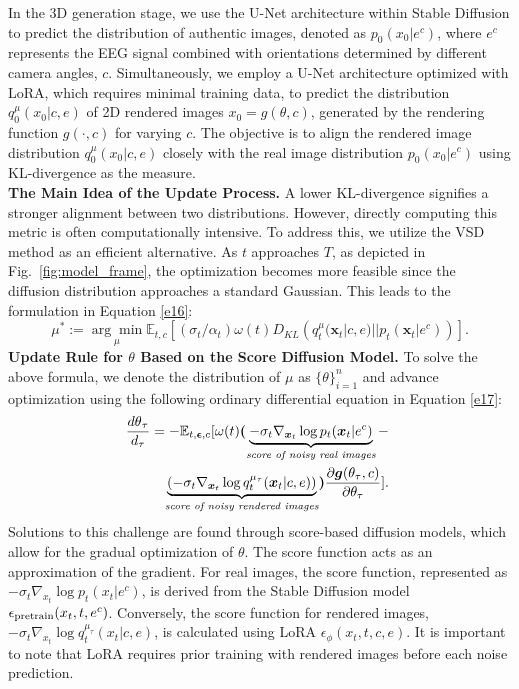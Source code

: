 \documentclass[conference]{IEEEtran}
\begin{document}
In the 3D generation stage, we use the U-Net architecture within Stable Diffusion to predict the distribution of authentic images, denoted as $ p_0(x_0|e^c) $, where $ e^c $ represents the EEG signal combined with orientations determined by different camera angles, $ c $. Simultaneously, we employ a U-Net architecture optimized with LoRA, which requires minimal training data, to predict the distribution $ q_0^\mu(x_0|c,e) $ of 2D rendered images $ x_0 = g(\theta, c) $, generated by the rendering function $ g(\cdot, c) $ for varying $ c $. The objective is to align the rendered image distribution $ q_0^\mu(x_0|c, e) $ closely with the real image distribution $ p_0(x_0|e^c) $ using KL-divergence as the measure.
\\
\textbf{The Main Idea of the Update Process.}
A lower KL-divergence signifies a stronger alignment between two distributions. However, directly computing this metric is often computationally intensive. To address this, we utilize the VSD method \cite{b11} as an efficient alternative. As $ t $ approaches $ T $, as depicted in Fig.~\ref{fig:model_frame}, the optimization becomes more feasible since the diffusion distribution approaches a standard Gaussian. This leads to the formulation in Equation \ref{e16}:
\vspace{-5pt} 
\begin{equation}\label{e16}
    \mu^* := \underset{\mu}{\arg \min} \mathbb{E}_{t,c} \left[ \left( {\sigma_t}/{\alpha_t} \right) \omega(t) {D}_{KL} \left( q_t^{\mu}(\bm{x}_t | c, e)||p_t(\bm{x}_t | e^c) \right) \right].
\end{equation}
\textbf{Update Rule for $\theta$ Based on the Score Diffusion Model.}
To solve the above formula, we denote the distribution of $ \mu $ as $ \{\theta\}_{i=1}^n $ and advance optimization using the following ordinary differential equation in Equation \ref{e17}:
\begin{equation}\label{e17}
\scalebox{1}{$
\begin{aligned}
    \frac{{d\theta}_{\tau}}{d_{\tau}}=-\mathbb{E}_{t,\bm\epsilon,c}[\omega(t)\bm{(}\underbrace{-{\sigma_t}\nabla_{\bm{x}_t}\log{p_t}(\bm{x}_t|e^c)}_{\textit{score of noisy real images}}-\\\underbrace{\left(-{\sigma_t}\nabla_{\bm{x}_t}\log{q_t^{\mu_\tau}}(\bm{x}_t|c,e)\right)}_{\textit{score of noisy rendered images}}\bm{)} \frac{\partial \bm{g}(\theta_\tau,c)}{\partial \theta_\tau}].
    \end{aligned}$
}
\end{equation}
Solutions to this challenge are found through score-based diffusion models, which allow for the gradual optimization of $ \theta $. The score function acts as an approximation of the gradient. For real images, the score function, represented as $ -\sigma_t\nabla_{x_t}\log p_t(x_t|e^c) $, is derived from the Stable Diffusion model $ \epsilon_{\textup{pretrain}}(x_t, t, e^c) $. Conversely, the score function for rendered images, $ -\sigma_t\nabla_{x_t}\log q_t^{\mu_\tau}(x_t|c, e) $, is calculated using LoRA $ \epsilon_\phi(x_t, t, c, e) $. It is important to note that LoRA requires prior training with rendered images before each noise prediction.
\end{document}
